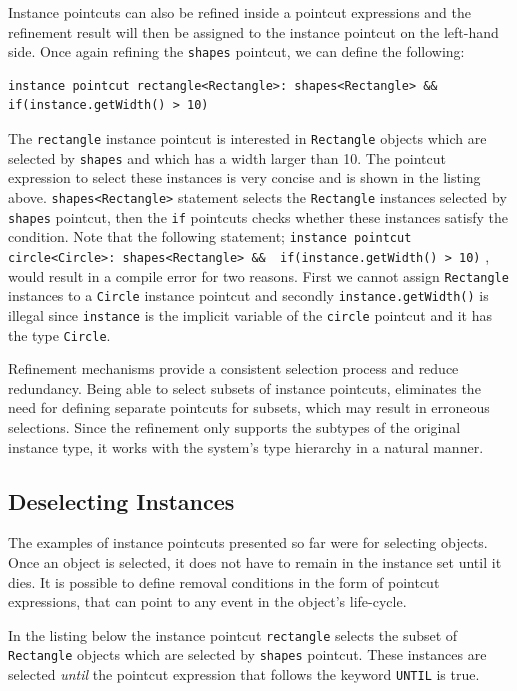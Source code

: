 \documentclass{llncs}
\begin{document}
Instance pointcuts can also be refined inside a pointcut expressions and the refinement result will then be assigned to the instance pointcut on the left-hand side. Once again refining the \texttt{shapes} pointcut, we can define the following:

\begin{lstlisting}[float=h!]
instance pointcut rectangle<Rectangle>: shapes<Rectangle> &&  if(instance.getWidth() > 10)
\end{lstlisting}

The \texttt{rectangle} instance pointcut is interested in \texttt{Rectangle} objects which are selected by \texttt{shapes} and which has a width larger than 10. The pointcut expression to select these instances is very concise and is shown in the listing above. \texttt{shapes<Rectangle>} statement selects the \texttt{Rectangle} instances selected by \texttt{shapes} pointcut, then the \texttt{if} pointcuts checks whether these instances satisfy the condition. Note that the following statement; \lstinline!instance pointcut circle<Circle>: shapes<Rectangle> &&  if(instance.getWidth() > 10)! , would result in a compile error for two reasons. First we cannot assign \texttt{Rectangle} instances to a \texttt{Circle} instance pointcut and secondly \texttt{instance.getWidth()} is illegal since \texttt{instance} is the implicit variable of the \texttt{circle} pointcut and it has the type \texttt{Circle}.

Refinement mechanisms provide a consistent selection process and reduce redundancy. Being able to select subsets of instance pointcuts, eliminates the need for defining separate pointcuts for subsets, which may result in erroneous selections. Since the refinement only supports the subtypes of the original instance type, it works with the system's type hierarchy in a natural manner. 

\subsection{Deselecting Instances}
\label{sec:deselect}
The examples of instance pointcuts presented so far were for selecting objects. Once an object is selected, it does not have to remain in the instance set until it dies. It is possible to define removal conditions in the form of pointcut expressions, that can point to any event in the object's life-cycle.

In the listing below the instance pointcut \texttt{rectangle} selects the subset of \texttt{Rectangle} objects which are selected by \texttt{shapes} pointcut. These instances are selected \emph{until} the pointcut expression that follows the keyword \texttt{UNTIL} is true.
\end{document}
